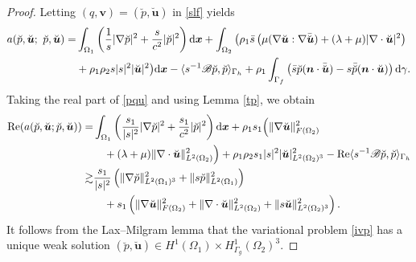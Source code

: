 \documentclass[final,leqno]{siamltex}
\begin{document}
\begin{proof}
Letting $(q, \boldsymbol v) =(\breve p, \breve {\boldsymbol u})$ in \eqref{slf}
yields
\begin{align}
 a(\breve p, \breve {\boldsymbol u};~ \breve p, \breve {\boldsymbol
u})=& \int_{\Omega_1} \left( \frac{1}{s} |\nabla \breve p|^2 + \frac{s}{c^2}
|\breve p|^2\right){\rm d} \boldsymbol  x +
 \int_{\Omega_2} \big(  \rho_1 \bar s \left( \mu (\nabla \breve {\boldsymbol u}:
\nabla \bar {\breve {\boldsymbol u}})+
 (\lambda+\mu) |\nabla \cdot \breve {\boldsymbol u}|^2\right) \nonumber\\
 &+\rho_1 \rho_2 s |s|^2 |\breve {\boldsymbol u}|^2\big) {\rm d}
\boldsymbol x -\langle s^{-1}\mathscr{B} \breve p, \breve p \rangle_{\Gamma_h}
 +\rho_1 \int_{\Gamma_f} \left( \bar s \breve p (\boldsymbol n \cdot \bar{
\breve{\boldsymbol u}}) - s \bar {\breve p}( \boldsymbol n \cdot \breve
{\boldsymbol u})\right) {\rm d}
\gamma.        \label{pqu}
\end{align}
Taking the real part of \eqref{pqu} and using Lemma \ref{tp}, we obtain
\begin{align}
 {\rm Re } ( a(\breve p, \breve {\boldsymbol u}; \breve p, \breve {\boldsymbol
u}) ) =&\int_{\Omega_1}\left( \frac{s_1}{|s|^2}|\nabla \breve p|^2
+\frac{s_1}{c^2 } |\breve p|^2\right) {\rm d} \boldsymbol  x
 +\rho_1 s_1 \Big( \|\nabla \breve {{\boldsymbol u}}\|^2_{F(\Omega_2)}\notag\\
&\quad +(\lambda+\mu) \|\nabla \cdot \breve {\boldsymbol u}\|^2_{L^2(\Omega_2)}
\Big)+\rho_1 \rho_2  s_1 |s|^2  |\breve {\boldsymbol u}|^2_{L^2
(\Omega_2)^3} - {\rm Re } \langle s^{-1} \mathscr{B} \breve p, \breve p
\rangle_{\Gamma_h} \notag\\
 \gtrsim &  \frac{s_1}{|s|^2 }
  \left( \|\nabla \breve {p}\|^2_{L^2 (\Omega_1)^3} +\|s \breve p\|^2_{L^2
(\Omega_1)} \right) \notag\\
&\quad + s_1   \left( \|\nabla \breve {{\boldsymbol u}}\|^2_{F(\Omega_2)}
+\|\nabla \cdot \breve {\boldsymbol u}\|^2_{L^2(\Omega_2)}+ \| s\breve
{\boldsymbol u}\|^2_{L^2 (\Omega_2)^3} \right).\label{RP}
\end{align}
It follows from the Lax--Milgram lemma that the variational problem \eqref{ivp}
has a unique weak solution $(\breve p, \breve {\boldsymbol u}) \in H^1(\Omega_1)
\times H^1_{\Gamma_g} (\Omega_2)^3.$


\end{proof}
\end{document}
